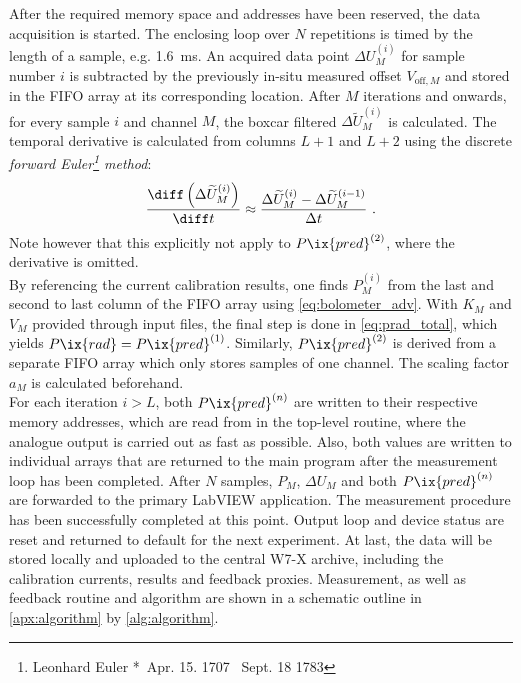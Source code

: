             After the required memory space and addresses have been reserved, the data acquisition is started. The enclosing loop over $N$ repetitions is timed by the length of a sample, e.g. \SI{1.6}{\milli\second}. An acquired data point $\Delta U_{M}^{\left(i\right)}$ for sample number $i$ is subtracted by the previously in-situ measured offset $V_{\text{off}, M}$ and stored in the FIFO array at its corresponding location. After $M$ iterations and onwards, for every sample $i$ and channel $M$, the boxcar filtered $\Delta\widetilde{U}_{M}^{\left(i\right)}$ is calculated. The temporal derivative is calculated from columns $L+1$ and $L+2$ using the discrete \textit{forward Euler\footnote[1]{Leonhard Euler *~Apr. 15. 1707 \textdagger~Sept. 18 1783} method}:%
%
            \begin{align}%
                \frac{\diff\left(\Delta\widetilde{U}_{M}^{\left(i\right)}\right)}{\diff t}\approx\frac{\Delta\widetilde{U}_{M}^{\left(i\right)}-\Delta\widetilde{U}_{M}^{\left(i-1\right)}}{\Delta t}\,\,.\nonumber%
            \end{align}%
%
            Note however that this explicitly not apply to $P\ix{pred}^{\left(2\right)}$, where the derivative is omitted.\\%
            By referencing the current calibration results, one finds $P_{M}^{\left(i\right)}$ from the last and second to last column of the FIFO array using \cref{eq:bolometer_adv}. With $K_{M}$ and $V_{M}$ provided through input files, the final step is done in \cref{eq:prad_total}, which yields $P\ix{rad}=P\ix{pred}^{\left(1\right)}$. Similarly, $P\ix{pred}^{\left(2\right)}$ is derived from a separate FIFO array which only stores samples of one channel. The scaling factor $a_{M}$ is calculated beforehand.\\%
            For each iteration $i>L$, both $P\ix{pred}^{\left(n\right)}$ are written to their respective memory addresses, which are read from in the top-level routine, where the analogue output is carried out as fast as possible. Also, both values are written to individual arrays that are returned to the main program after the measurement loop has been completed. After $N$ samples, $P_{M}$, $\Delta U_{M}$ and both $P\ix{pred}^{\left(n\right)}$ are forwarded to the primary LabVIEW application. The measurement procedure has been successfully completed at this point. Output loop and device status are reset and returned to default for the next experiment. At last, the data will be stored locally and uploaded to the central W7-X archive, including the calibration currents, results and feedback proxies. Measurement, as well as feedback routine and algorithm are shown in a schematic outline in \cref{apx:algorithm} by \autoref{alg:algorithm}.\\%
